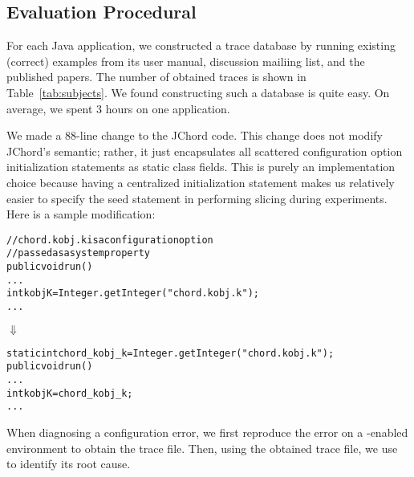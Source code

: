 \subsection{Evaluation Procedural}

For each Java application, we constructed a trace database
by running existing (correct) examples from its user manual, discussion
mailiing list, and the published papers. The number of obtained
 traces is shown in Table~\ref{tab:subjects}. 
We found constructing such a database is quite easy. On average,
we spent 3 hours on one application.


We made a 88-line change to the JChord code. This change
does not modify JChord's semantic; rather, it just encapsulates
all scattered configuration option initialization statements 
as static class fields. This is purely an implementation
choice because having a centralized initialization statement
makes us relatively easier to specify the seed statement
in performing slicing during experiments. Here is a sample modification:



\begin{CodeOut}
\begin{alltt}
   // chord.kobj.k is a configuration option
   // passed as a system property
   public void run() \ttlcb
     ...
     int kobjK = Integer.getInteger("chord.kobj.k");
     ...
   \ttrcb
\end{alltt}
\end{CodeOut}
\vspace{-4mm}
\hspace{20mm}$\Downarrow$ 
\begin{CodeOut}
\begin{alltt}
   static int chord\_kobj\_k = Integer.getInteger("chord.kobj.k");
   public void run() \ttlcb
     ...
     int kobjK = chord\_kobj\_k; 
     ...
   \ttrcb
\end{alltt}
\end{CodeOut}






When diagnosing a configuration error, we first reproduce the
error on a \ourtool-enabled environment to obtain the
trace file. Then, using the obtained trace file, we use \ourtool
to identify its root cause.

